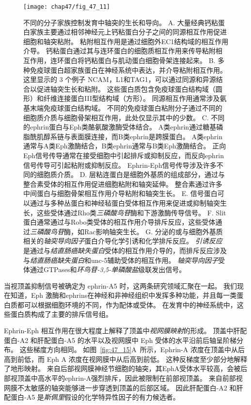 \begin{figure}[htbp]
	\centering
	\texttt{[image: chap47/fig\_47\_11]}
	\caption{不同的分子家族控制发育中轴突的生长和导向。
		A. 大量经典钙粘蛋白家族主要通过相邻神经元上钙粘蛋白分子之间的同源相互作用促进细胞和轴突粘附。
		粘附相互作用是通过细胞外EC1结构域的相互作用介导。
		钙粘蛋白通过其与连环蛋白的细胞质相互作用来传导粘附相互作用，连环蛋白将钙粘蛋白与肌动蛋白细胞骨架连接起来。
		B. 多种免疫球蛋白超家族蛋白在神经系统中表达，并介导粘附相互作用。
		这里显示的 3 个例子 NCAM，L1和TAG1，可以通过同源和异源结合以促进轴突生长和粘附。
		这些蛋白质包含免疫球蛋白结构域（圆形）和纤维连接蛋白III型结构域（方形）。
		同源相互作用通常涉及氨基末端免疫球蛋白结构域。
		不同的免疫球蛋白粘附分子通过不同的细胞质介质与细胞骨架相互作用，此处仅显示其中的少数。
		C. 不同的ephrin蛋白与Eph类酪氨酸激酶受体结合。
		A类ephrin通过糖基磷脂酰肌醇系链与表面膜连接，而B类ephrin是跨膜蛋白。
		A类ephrin通常与A类Eph激酶结合，B类ephrin通常与B类Eph激酶结合。
		正向Eph信号传导通常在接受细胞中引起排斥或抑制反应，而反向ephrin信号传导可引起粘附或抑制反应。
		Ephrin-Eph信号传导涉及许多不同的细胞质介质。
		D. 层粘连蛋白是细胞外基质的组成部分，通过与整合素受体的相互作用促进细胞粘附和轴突延伸。
		整合素通过许多中间蛋白与细胞骨架相互作用介导粘附和轴突生长。
		E. 信号蛋白可以通过与多种丛蛋白和神经毡蛋白受体相互作用来促进或抑制轴突生长，这些受体通过Rho类\textit{三磷酸鸟苷}酶和下游激酶传导信号。
		F. Slit蛋白通常通过与Robo类受体的相互作用介导排斥反应，这些受体通过\textit{三磷酸鸟苷}酶，如Rac影响轴突生长。
		G. 分泌的或与细胞外基质相关的\textit{轴突导向因子}蛋白介导化学引诱和化学排斥反应。
		\textit{引诱反应}是通过与\textit{结直肠癌缺失蛋白}受体的相互作用介导的，而排斥反应涉及与\textit{结直肠癌缺失蛋白}和unc-5辅助受体的相互作用。
		\textit{轴突导向因子}受体通过GTPases和\textit{环鸟苷-3,5-单磷酸盐}级联发出信号。}
	\label{fig:47_11}
\end{figure}


当视顶盖抑制信号被确定为 ephrin-A5 时，这两条研究领域汇聚在一起。
我们现在知道，Eph 激酶和ephrins在神经和非神经组织中发挥多种功能，并且每一类蛋白质都可以根据细胞环境的不同，作为配体或受体。
在发育中的神经系统中，这些蛋白质构成了主要的排斥信号组。


Ephrin-Eph 相互作用在很大程度上解释了顶盖中\textit{视网膜映射}的形成。
顶盖中肝配蛋白-A2 和肝配蛋白-A5 的水平以及视网膜中 Eph 受体的水平沿前后轴呈阶梯分布。
这些梯度方向相同。
如图~\ref{fig:47_15}A~所示，Ephrin-A 浓度在顶盖中从后高到前低，而 Eph A 浓度在视网膜中从后高到前低。
这种反梯度至少部分地解释了地形映射。
来自后部视网膜神经节细胞的轴突，其EphA受体水平较高，会被后部视顶盖中高水平的ephrin-A强烈排斥，因此被限制在前部视顶盖。
来自前部视网膜不太敏感的轴突能够进一步穿透到顶盖的后部区域。
因此肝配蛋白-A2 和肝配蛋白-A5 是\textit{斯佩里}假设的化学特异性因子的有力候选者。


